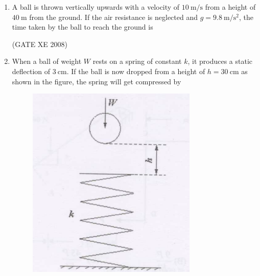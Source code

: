 \documentclass[12pt]{article}
\begin{document}
\begin{enumerate}
\begin{enumerate}
\end{enumerate}

    (GATE XE 2008)

    \item A ball is thrown vertically upwards with a velocity of $10 \ \mathrm{m/s}$ from a height of $40 \ \mathrm{m}$ from the ground. If the air resistance is neglected and $g = 9.8 \ \mathrm{m/s^2}$, the time taken by the ball to reach the ground is

\begin{enumerate}
\end{enumerate}

    (GATE XE 2008)


    \item When a ball of weight $W$ rests on a spring of constant $k$, it produces a static deflection of $3\ \mathrm{cm}$. If the ball is now dropped from a height of $h = 30\ \mathrm{cm}$ as shown in the figure, the spring will get compressed by  

    \begin{figure}[H]
    \centering
    \includegraphics[width=0.5\columnwidth]{figs/ass1_f_q20.png}
    \caption{}
    \end{figure}


\end{enumerate}
\end{document}
